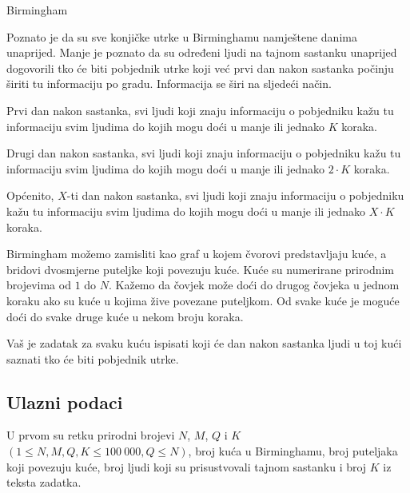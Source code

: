 \begin{statement}[
  problempoints=70,
  timelimit=1 sekunda,
  memorylimit=512 MiB,
]{Birmingham}


Poznato je da su sve konjičke utrke u Birminghamu namještene danima unaprijed.
Manje je poznato da su određeni ljudi na tajnom sastanku unaprijed dogovorili
tko će biti pobjednik utrke koji već prvi dan nakon sastanka počinju širiti
tu informaciju po gradu. Informacija se širi na sljedeći način.

Prvi dan nakon sastanka, svi ljudi koji znaju informaciju o pobjedniku kažu tu
informaciju svim ljudima do kojih mogu doći u manje ili jednako $K$ koraka.

Drugi dan nakon sastanka, svi ljudi koji znaju informaciju o pobjedniku kažu tu
informaciju svim ljudima do kojih mogu doći u manje ili jednako $2 \cdot K$ koraka.

Općenito, $X$-ti dan nakon sastanka, svi ljudi koji znaju informaciju o
pobjedniku kažu tu informaciju svim ljudima do kojih mogu doći u manje ili
jednako $X \cdot K$ koraka.

Birmingham možemo zamisliti kao graf u kojem čvorovi predstavljaju kuće, a
bridovi dvosmjerne puteljke koji povezuju kuće. Kuće su numerirane prirodnim
brojevima od $1$ do $N$. Kažemo da čovjek može doći do drugog čovjeka u jednom
koraku ako su kuće u kojima žive povezane puteljkom. Od svake kuće je
moguće doći do svake druge kuće u nekom broju koraka.

Vaš je zadatak za svaku kuću ispisati koji će dan nakon sastanka ljudi u toj
kući saznati tko će biti pobjednik utrke.

\subsection*{Ulazni podaci}
U prvom su retku prirodni brojevi $N$, $M$, $Q$ i $K$ $(1 \le N, M, Q, K \le
100\ 000, Q \le N)$, broj kuća u Birminghamu, broj puteljaka koji povezuju kuće, broj
ljudi koji su prisustvovali tajnom sastanku i broj $K$ iz teksta zadatka.


\end{statement}
